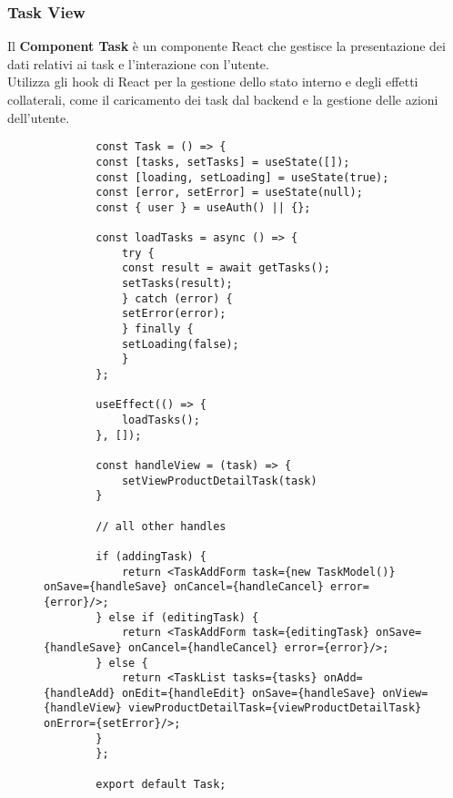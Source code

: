\subsubsection{Task View}
Il \textbf{Component Task} è un componente React che gestisce la presentazione dei dati relativi ai task e l'interazione con l'utente.\\
Utilizza gli hook di React per la gestione dello stato interno e degli effetti collaterali, come il caricamento dei task dal backend e la gestione delle azioni dell'utente.
\begin{figure}[H]
    \centering
    \begin{verbatim}
        const Task = () => {
        const [tasks, setTasks] = useState([]);
        const [loading, setLoading] = useState(true);
        const [error, setError] = useState(null);
        const { user } = useAuth() || {};

        const loadTasks = async () => {
            try {
            const result = await getTasks();
            setTasks(result);
            } catch (error) {
            setError(error);
            } finally {
            setLoading(false);
            }
        };

        useEffect(() => {
            loadTasks();
        }, []);
        
        const handleView = (task) => {
            setViewProductDetailTask(task)
        }

        // all other handles

        if (addingTask) {
            return <TaskAddForm task={new TaskModel()} onSave={handleSave} onCancel={handleCancel} error={error}/>;
        } else if (editingTask) {
            return <TaskAddForm task={editingTask} onSave={handleSave} onCancel={handleCancel} error={error}/>;
        } else {
            return <TaskList tasks={tasks} onAdd={handleAdd} onEdit={handleEdit} onSave={handleSave} onView={handleView} viewProductDetailTask={viewProductDetailTask} onError={setError}/>;
        }
        };

        export default Task;
\end{verbatim}
\end{figure}


